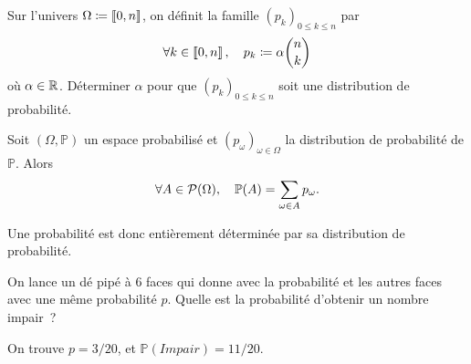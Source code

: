 \documentclass{magnolia}
\begin{document}

\begin{exoUnique}
\exo Sur l'univers $\Omega\coloneqq\left\llbracket 0,n\right\rrbracket$, on définit la famille $(p_k)_{0\leq k\leq n}$ par
  \[\forall k\in\left\llbracket 0,n\right\rrbracket,\quad p_k\coloneqq\alpha\binom{n}{k}\]
  où $\alpha\in\mathbb{R}$. Déterminer $\alpha$ pour que $(p_k)_{0\leq k\leq n}$ soit une distribution de probabilité. 
\end{exoUnique}


\begin{proposition}
Soit $(\Omega,\mathbb{P})$ un espace probabilisé et $(p_\omega)_{\omega\in\Omega}$ la distribution de probabilité de $\mathbb{P}$. Alors
\[\forall A\in\mathcal{P}(\Omega),\quad \mathbb{P}(A)=\sum_{\omega\in A} p_{\omega}.\]
\end{proposition}

\begin{remarqueUnique}
\remarque Une probabilité est donc entièrement déterminée par sa distribution de probabilité.
\end{remarqueUnique}

\begin{exoUnique}
\exo On lance un dé pipé à 6 faces qui donne  \fg avec la probabilité  et les
  autres faces avec une même probabilité $p$. Quelle est la probabilité d'obtenir un nombre impair~?
  \begin{sol}
  On trouve $p=3/20$, et $\mathbb{P}(Impair)=11/20$.
  \end{sol}
\end{exoUnique}
\end{document}
